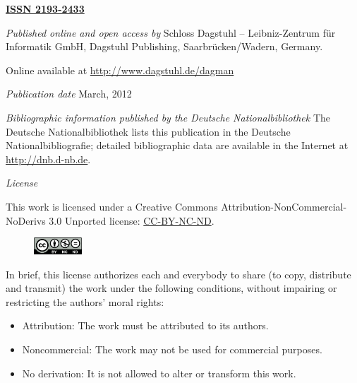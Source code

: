 \documentclass[a4paper,UKenglish]{dagman-master}
\begin{document}
\begin{publicationinfo}%
\sffamily
\twocolumn



{\Large\bf\sffamily \textbf{\href{http://www.dagstuhl.de/dagman}{ISSN 2193-2433}}}

\bigskip
\bigskip

\emph{Published online and open access by}\newline 
Schloss Dagstuhl -- Leibniz-Zentrum f\"ur Informatik GmbH, Dagstuhl
Publishing, Saarbr\"ucken/Wadern, Germany. 

Online available at \href{http://www.dagstuhl.de/dagman}{http://www.dagstuhl.de/dagman}

\bigskip
\emph{Publication date}\newline
March, 2012

\bigskip
\emph{Bibliographic information published by the Deutsche
  Nationalbibliothek}\newline 
The Deutsche Nationalbibliothek lists this publication in the Deutsche
Nationalbibliografie; detailed bibliographic data are available in the
Internet at \url{http://dnb.d-nb.de}.

\bigskip
\emph{License}

This work is licensed under  a Creative Commons
Attribution-NonCommercial-NoDerivs 3.0 Unported license:
\href{http://creativecommons.org/licenses/by-nc-nd/3.0/legalcode}{CC-BY-NC-ND}.

\begin{figure}
\vspace*{-1\baselineskip}
\includegraphics[width=1.8cm]{cc-by-nc-nd}
\end{figure} 
In brief, this license authorizes each and everybody to share (to
copy, distribute and transmit) the work under the following
conditions, without impairing or restricting the authors'
moral rights:

\begin{itemize}
\item Attribution: The work must be attributed to its authors.
\item Noncommercial: The work may not be used for commercial purposes. 
\item No derivation: It is not allowed to alter or transform this work.
\end{itemize}


\end{publicationinfo}
\end{document}
